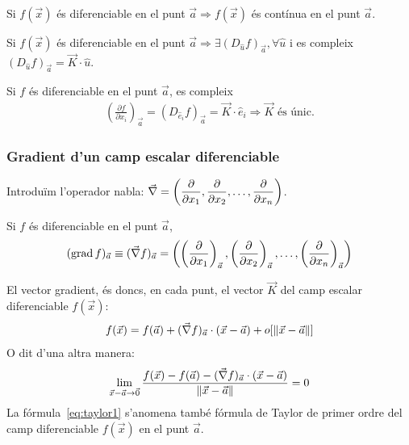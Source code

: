 \begin{thm}
    Si $f(\vec{x})$ és diferenciable en el punt $\vec{a} \Rightarrow f(\vec{x})$ és contínua en el punt $\vec{a}$.
\end{thm}
\begin{thm}
    Si $f(\vec{x})$ és diferenciable en el punt $\vec{a} \Rightarrow \exists (D_{\hat{u}} f)_{\vec{a}}, \forall \hat{u}$ i es compleix $(D_{\hat{u}} f)_{\vec{a}} = \vec{K} \cdot \hat{u}$.
\end{thm}
\begin{cor}
    Si $f$ és diferenciable en el punt $\vec{a}$, es compleix
        \begin{align*}
            \left( \frac{\partial f}{\partial x_{i}} \right)_{\vec{a}} = (D_{\hat{e}_{i}} f)_{\vec{a}} = \vec{K}\cdot \hat{e}_{i} \Rightarrow \vec{K} \text{ és únic.}
    \end{align*}
\end{cor}

\subsubsection*{Gradient d'un camp escalar diferenciable}
Introduïm l'operador nabla: $\displaystyle \vec{\nabla} = \left( \frac{\partial}{\partial x_{1}}, \frac{\partial}{\partial x_{2}}, \dots, \frac{\partial}{\partial x_{n}} \right)$.
\begin{defi}[Gradient]
    Si $f$ és diferenciable en el punt $\vec{a}$, 
    \begin{align}
        (\operatorname{grad} f)_{\vec{a}} \equiv (\vec{\nabla} f)_{\vec{a}} = \left( \left( \frac{\partial}{\partial x_{1}} \right)_{\vec{a}}, \left( \frac{\partial}{\partial x_{2}} \right)_{\vec{a}}, \dots, \left( \frac{\partial}{\partial x_{n}} \right)_{\vec{a}} \right) 
    \end{align}
\end{defi}
El vector gradient, és doncs, en cada punt, el vector $\vec{K}$ del camp escalar diferenciable $f(\vec{x})$:
\begin{align}\label{eq:taylor1}
    f(\vec{x}) = f(\vec{a}) + (\vec{\nabla} f)_{\vec{a}} \cdot (\vec{x} - \vec{a}) + o[\| \vec{x} - \vec{a} \|]
\end{align}
O dit d'una altra manera:
\begin{align}
    \lim_{\vec{x} - \vec{a} \to \vec{0}} \frac{f(\vec{x}) - f(\vec{a}) - (\vec{\nabla} f)_{\vec{a}} \cdot (\vec{x} - \vec{a})}{\| \vec{x} - \vec{a} \|} = 0
\end{align}
La fórmula~\eqref{eq:taylor1} s'anomena també fórmula de Taylor de primer ordre del camp diferenciable $f(\vec{x})$ en el punt $\vec{a}$.


